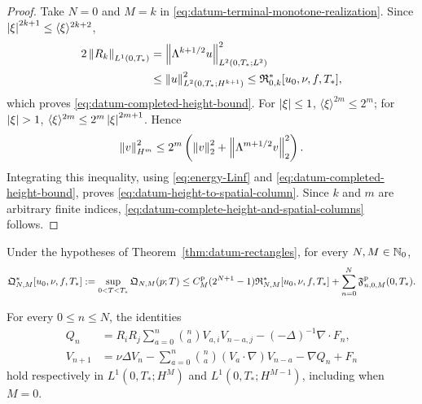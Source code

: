 \begin{samepage}
\begin{proof}
Take \(N=0\) and \(M=k\) in
\eqref{eq:datum-terminal-monotone-realization}.  Since
\(\left|\xi\right|^{2k+1}\le\langle\xi\rangle^{2k+2}\),
\begin{align*}
 2\left\lVert R_k\right\rVert_{L^1(0,T_*)}
 &=\left\lVert \Lambda^{k+1/2}u\right\rVert_{L^2(0,T_*;L^2)}^2\\
 &\le\left\lVert u\right\rVert_{L^2(0,T_*;H^{k+1})}^2
 \le\mathfrak R_{0,k}^*[u_0,\nu,f,T_*],
\end{align*}
which proves \eqref{eq:datum-completed-height-bound}.  For
\(\left|\xi\right|\le1\),
\(\langle\xi\rangle^{2m}\le2^m\); for \(\abs\xi>1\),
\(\langle\xi\rangle^{2m}\le2^m\left|\xi\right|^{2m+1}\).  Hence
\[
 \left\lVert v\right\rVert_{H^m}^2
 \le2^m\left(\left\lVert v\right\rVert_2^2+
 \left\lVert \Lambda^{m+1/2}v\right\rVert_2^2\right).
\]
Integrating this inequality, using
\eqref{eq:energy-Linf} and
\eqref{eq:datum-completed-height-bound}, proves
\eqref{eq:datum-height-to-spatial-column}.  Since \(k\) and \(m\) are
arbitrary finite indices, \eqref{eq:datum-complete-height-and-spatial-columns}
follows.
\end{proof}
\end{samepage}

\begin{proposition}
\label{prop:rectangle-pressure-completion}
Under the hypotheses of Theorem~\ref{thm:datum-rectangles}, for every
\(N,M\in\mathbb N_0\),
\begin{equation}
 \mathfrak Q_{N,M}^*[u_0,\nu,f,T_*]
 :=\sup_{0<T<T_*}\mathfrak Q_{N,M}(p;T)
 \le
 C_M^{\rm p}(2^{N+1}-1)\mathfrak R_{N,M}^*[u_0,\nu,f,T_*]
 +\sum_{n=0}^N\mathfrak F^{\rm p}_{n,0,M}(0,T_*).
 \label{eq:whole-terminal-pressure-bound}
\end{equation}
\begin{samepage}
For every \(0\le n\le N\), the identities
\begin{align}
 Q_n
 &=R_iR_j\sum_{a=0}^n\binom naV_{a,i}V_{n-a,j}
 -(-\Delta)^{-1}\nabla\cdot F_n,
 \label{eq:rectangle-pressure-identity}\\
 V_{n+1}
 &=\nu\Delta V_n
 -\sum_{a=0}^n\binom na(V_a\cdot\nabla)V_{n-a}-\nabla Q_n+F_n
 \label{eq:rectangle-velocity-identity}
\end{align}
hold respectively in
\(L^1(0,T_*;H^M)\) and \(L^1(0,T_*;H^{M-1})\), including when
\(M=0\).
\end{samepage}
\end{proposition}

